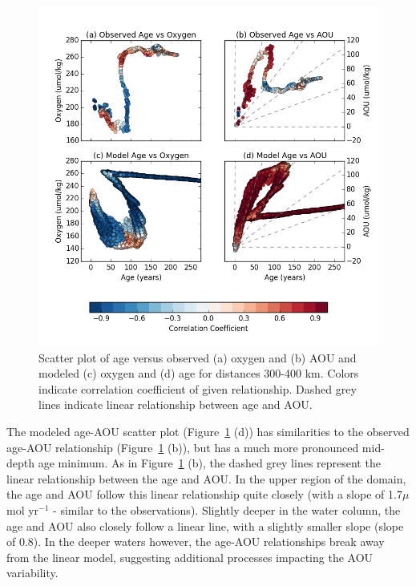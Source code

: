 \begin{figure}
\centering
\includegraphics[width=\linewidth]{age_aou_scatter.png}
\caption{Scatter plot of age versus observed (a) oxygen and (b) AOU and
modeled (c) oxygen and (d) age for distances 300-400 km.
Colors indicate correlation coefficient of given relationship. Dashed grey lines indicate linear relationship between age and AOU.}
\label{fig:scatter_plots}
\end{figure}

The modeled age-AOU scatter plot (Figure~\ref{fig:scatter_plots} (d)) has
similarities to the observed age-AOU relationship (Figure~\ref{fig:scatter_plots}
(b)), but has a much more pronounced mid-depth age minimum. As in
Figure~\ref{fig:scatter_plots} (b), the dashed grey lines represent the linear
relationship between the age and AOU. In the upper region of the domain, the age
and AOU follow this linear relationship quite closely (with a slope of 1.7$\mu$mol yr$^{-1}$
- similar to the observations). Slightly deeper in the water column, the age and
AOU also closely follow a linear line, with a slightly smaller slope (slope of 0.8).
In the deeper waters however, the age-AOU relationships break away from the linear
model, suggesting additional processes impacting the AOU variability.

